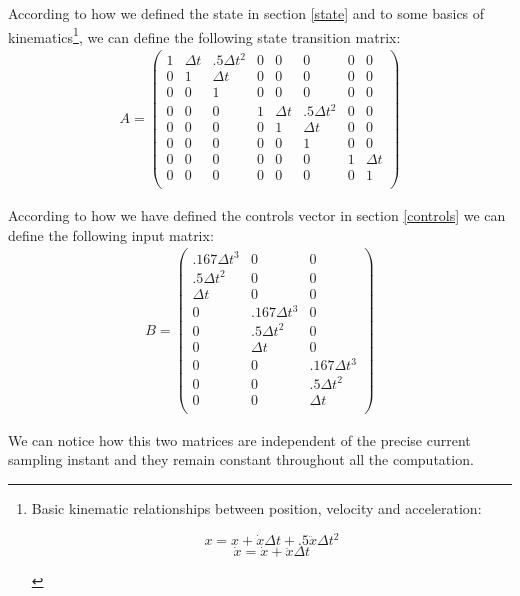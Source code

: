 According to how we defined the state in section \ref{state} and to some basics of kinematics\footnote{Basic kinematic relationships between position, velocity and acceleration:\begin{fleqn}\begin{equation}x = x + \dot{x} \Delta t + .5 \ddot{x} \Delta t^2\nonumber\end{equation}\begin{equation}\dot{x} = \dot{x} + \ddot{x} \Delta t\nonumber\end{equation}\end{fleqn}}, we can define the following state transition matrix:
\begin{align}
	A = \begin{pmatrix}
				1 & \Delta t & .5 \Delta t^2 & 0 & 0 & 0 & 0 & 0\\
				0 & 1 & \Delta t & 0 & 0 & 0 & 0 & 0\\
				0 & 0 & 1 & 0 & 0 & 0 & 0 & 0\\
				0 & 0 & 0 & 1 & \Delta t & .5 \Delta t^2 & 0 & 0\\
				0 & 0 & 0 & 0 & 1 & \Delta t & 0 & 0\\
				0 & 0 & 0 & 0 & 0 & 1 & 0 & 0\\
				0 & 0 & 0 & 0 & 0 & 0 & 1 & \Delta t\\
				0 & 0 & 0 & 0 & 0 & 0 & 0 & 1\\
			\end{pmatrix}
\end{align}

According to how we have defined the controls vector in section \ref{controls} we can define the following input matrix:
\begin{align}
	B = \begin{pmatrix}
				.167 \Delta t^3 & 0 & 0\\
				.5 \Delta t^2 & 0 & 0\\
				\Delta t & 0 & 0\\
				0 & .167 \Delta t^3 & 0\\
				0 & .5 \Delta t^2 & 0\\
				0 & \Delta t & 0\\
				0 & 0 & .167 \Delta t^3\\
				0 & 0 & .5 \Delta t^2\\
				0 & 0 & \Delta t\\
			\end{pmatrix}
\end{align}

We can notice how this two matrices are independent of the precise current sampling instant and they remain constant throughout all the computation.\\

